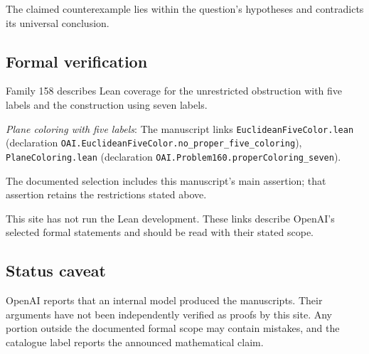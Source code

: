 \documentclass[11pt]{article}
\begin{document}
The claimed counterexample lies within the question’s hypotheses and contradicts its universal conclusion.

\subsection{Formal verification}
Family 158 describes Lean coverage for the unrestricted obstruction with five labels and the construction using seven labels.

\textit{Plane coloring with five labels}: The manuscript links \texttt{EuclideanFiveColor.lean} (declaration \texttt{OAI.EuclideanFiveColor.no\_proper\_five\_coloring}), \texttt{PlaneColoring.lean} (declaration \texttt{OAI.Problem160.properColoring\_seven}).

The documented selection includes this manuscript’s main assertion; that assertion retains the restrictions stated above.

This site has not run the Lean development. These links describe OpenAI’s selected formal statements and should be read with their stated scope.

\subsection{Status caveat}
OpenAI reports that an internal model produced the manuscripts. Their arguments have not been independently verified as proofs by this site. Any portion outside the documented formal scope may contain mistakes, and the catalogue label reports the announced mathematical claim.
\end{document}
